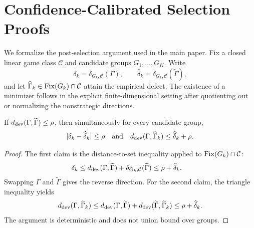 \section{Confidence-Calibrated Selection Proofs}

We formalize the post-selection argument used in the main paper.  Fix a closed linear game class $\mathcal C$ and candidate groups $G_1,\ldots,G_K$.  Write
\[
\delta_k=\delta_{G_k,\mathcal C}(\Gamma),
\qquad
\widehat\delta_k=\delta_{G_k,\mathcal C}(\widetilde\Gamma),
\]
and let $\widehat\Gamma_k\in\operatorname{Fix}(G_k)\cap\mathcal C$ attain the empirical defect.  The existence of a minimizer follows in the explicit finite-dimensional setting after quotienting out or normalizing the nonstrategic directions.

\begin{lemma}
\label{lem:supp-selection-stability}
If $d_{\mathrm{dev}}(\Gamma,\widetilde\Gamma)\le\rho$, then simultaneously for every candidate group,
\[
|\delta_k-\widehat\delta_k|\le\rho
\quad\text{and}\quad
d_{\mathrm{dev}}(\Gamma,\widehat\Gamma_k)
\le\widehat\delta_k+\rho.
\]
\end{lemma}
\begin{proof}
The first claim is the distance-to-set inequality applied to
$\operatorname{Fix}(G_k)\cap\mathcal C$:
\begin{align*}
\delta_k
&\le
d_{\mathrm{dev}}(\Gamma,\widetilde\Gamma)
+
\delta_{G_k,\mathcal C}(\widetilde\Gamma)
\le\rho+\widehat\delta_k.
\end{align*}
Swapping $\Gamma$ and $\widetilde\Gamma$ gives the reverse direction.  For the second claim, the triangle inequality yields
\[
d_{\mathrm{dev}}(\Gamma,\widehat\Gamma_k)
\le
d_{\mathrm{dev}}(\Gamma,\widetilde\Gamma)
+
d_{\mathrm{dev}}(\widetilde\Gamma,\widehat\Gamma_k)
\le\rho+\widehat\delta_k.
\]
The argument is deterministic and does not union bound over groups.
\end{proof}

